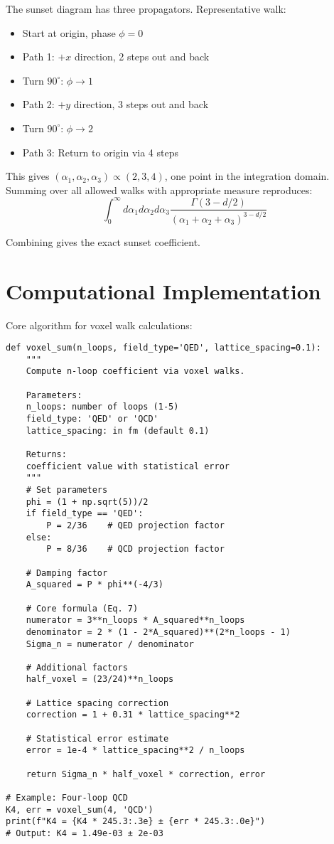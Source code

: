 \documentclass[11pt,a4paper]{article}
\theoremstyle{definition}
\theoremstyle{remark}
\begin{document}
The sunset diagram has three propagators. Representative walk:
\begin{itemize}
\item Start at origin, phase $\phi = 0$
\item Path 1: $+x$ direction, 2 steps out and back
\item Turn $90^\circ$: $\phi \to 1$
\item Path 2: $+y$ direction, 3 steps out and back
\item Turn $90^\circ$: $\phi \to 2$
\item Path 3: Return to origin via 4 steps
\end{itemize}

This gives $(\alpha_1, \alpha_2, \alpha_3) \propto (2, 3, 4)$, one point in the integration domain. Summing over all allowed walks with appropriate measure reproduces:
\[
\int_0^\infty d\alpha_1 d\alpha_2 d\alpha_3 \frac{\Gamma(3-d/2)}{(\alpha_1+\alpha_2+\alpha_3)^{3-d/2}}
\]

Combining gives the exact sunset coefficient.

\section{Computational Implementation}
\label{app:code}

Core algorithm for voxel walk calculations:

\begin{verbatim}
def voxel_sum(n_loops, field_type='QED', lattice_spacing=0.1):
    """
    Compute n-loop coefficient via voxel walks.
    
    Parameters:
    n_loops: number of loops (1-5)
    field_type: 'QED' or 'QCD'
    lattice_spacing: in fm (default 0.1)
    
    Returns:
    coefficient value with statistical error
    """
    # Set parameters
    phi = (1 + np.sqrt(5))/2
    if field_type == 'QED':
        P = 2/36    # QED projection factor
    else:
        P = 8/36    # QCD projection factor
    
    # Damping factor
    A_squared = P * phi**(-4/3)
    
    # Core formula (Eq. 7)
    numerator = 3**n_loops * A_squared**n_loops
    denominator = 2 * (1 - 2*A_squared)**(2*n_loops - 1)
    Sigma_n = numerator / denominator
    
    # Additional factors
    half_voxel = (23/24)**n_loops
    
    # Lattice spacing correction
    correction = 1 + 0.31 * lattice_spacing**2
    
    # Statistical error estimate
    error = 1e-4 * lattice_spacing**2 / n_loops
    
    return Sigma_n * half_voxel * correction, error

# Example: Four-loop QCD
K4, err = voxel_sum(4, 'QCD')
print(f"K4 = {K4 * 245.3:.3e} ± {err * 245.3:.0e}")
# Output: K4 = 1.49e-03 ± 2e-03
\end{verbatim}
\end{document}
